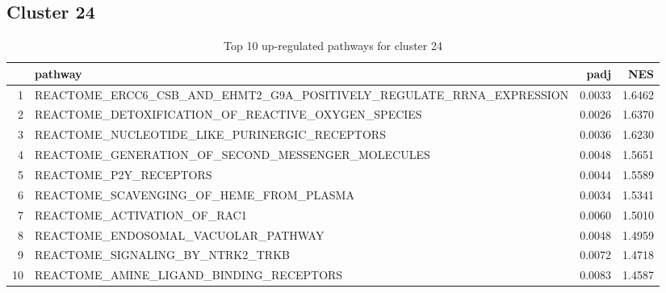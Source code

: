 \documentclass{article}
\begin{document}
\subsection{Cluster 24 }
\begin{table}[H]
\centering
\begin{tabularx}{\textwidth}{rlrr}
  \hline
 & pathway & padj & NES \\ 
  \hline
1 & REACTOME\_ERCC6\_CSB\_AND\_EHMT2\_G9A\_POSITIVELY\_REGULATE\_RRNA\_EXPRESSION & 0.0033 & 1.6462 \\ 
  2 & REACTOME\_DETOXIFICATION\_OF\_REACTIVE\_OXYGEN\_SPECIES & 0.0026 & 1.6370 \\ 
  3 & REACTOME\_NUCLEOTIDE\_LIKE\_PURINERGIC\_RECEPTORS & 0.0036 & 1.6230 \\ 
  4 & REACTOME\_GENERATION\_OF\_SECOND\_MESSENGER\_MOLECULES & 0.0048 & 1.5651 \\ 
  5 & REACTOME\_P2Y\_RECEPTORS & 0.0044 & 1.5589 \\ 
  6 & REACTOME\_SCAVENGING\_OF\_HEME\_FROM\_PLASMA & 0.0034 & 1.5341 \\ 
  7 & REACTOME\_ACTIVATION\_OF\_RAC1 & 0.0060 & 1.5010 \\ 
  8 & REACTOME\_ENDOSOMAL\_VACUOLAR\_PATHWAY & 0.0048 & 1.4959 \\ 
  9 & REACTOME\_SIGNALING\_BY\_NTRK2\_TRKB & 0.0072 & 1.4718 \\ 
  10 & REACTOME\_AMINE\_LIGAND\_BINDING\_RECEPTORS & 0.0083 & 1.4587 \\ 
   \hline
\end{tabularx}
\caption{Top 10 up-regulated pathways for cluster 24} 
\label{tab:q3_2_24}
\end{table}
\end{document}
